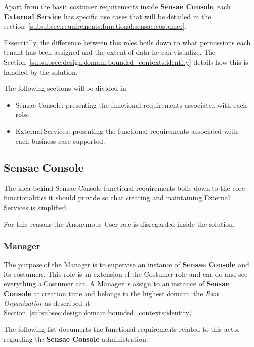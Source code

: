 Apart from the basic costumer requirements inside \textbf{Sensae Console}, each \textbf{External Service} has specific use cases that will be detailed in the section~\ref{subsubsec:requirements:functional:sensae:costumer}.

Essentially, the difference between this roles boils down to what permissions each tenant has been assigned and the extent of data he can visualize. The Section~\ref{subsubsec:design:domain:bounded_contexts:identity} details how this is handled by the solution.

The following sections will be divided in:

\begin{itemize}
    \item Sensae Console: presenting the functional requirements associated with each role;
    \item External Services: presenting the functional requirements associated with each business case supported.
\end{itemize}

\subsection{Sensae Console}
\label{subsec:requirements:functional:sensae}

The idea behind Sensae Console functional requirements boils down to the core functionalities it should provide so that creating and maintaining External Services is simplified.

For this reasons the Anonymous User role is disregarded inside the solution. 

\subsubsection{Manager}
\label{subsubsec:requirements:functional:sensae:manager}

The purpose of the Manager is to supervise an instance of \textbf{Sensae Console} and its costumers. This role is an extension of the Costumer role and can do and see everything a Costumer can. A Manager is assign to an instance of \textbf{Sensae Console} at creation time and belongs to the highest domain, the \textit{Root Organization} as described at Section~\ref{subsubsec:design:domain:bounded_contexts:identity}.

The following list documents the functional requirements related to this actor regarding the \textbf{Sensae Console} administration:

